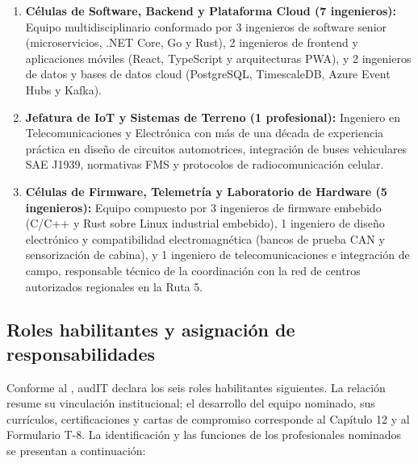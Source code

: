 \begin{enumerate}
  \item \textbf{Células de Software, Backend y Plataforma Cloud (7 ingenieros):} Equipo multidisciplinario conformado por 3 ingenieros de software senior (microservicios, .NET Core, Go y Rust), 2 ingenieros de frontend y aplicaciones móviles (React, TypeScript y arquitecturas PWA), y 2 ingenieros de datos y bases de datos cloud (PostgreSQL, TimescaleDB, Azure Event Hubs y Kafka).
  \item \textbf{Jefatura de IoT y Sistemas de Terreno (1 profesional):} Ingeniero en Telecomunicaciones y Electrónica con más de una década de experiencia práctica en diseño de circuitos automotrices, integración de buses vehiculares SAE J1939, normativas FMS y protocolos de radiocomunicación celular.
  \item \textbf{Células de Firmware, Telemetría y Laboratorio de Hardware (5 ingenieros):} Equipo compuesto por 3 ingenieros de firmware embebido (C/C++ y Rust sobre Linux industrial embebido), 1 ingeniero de diseño electrónico y compatibilidad electromagnética (bancos de prueba CAN y sensorización de cabina), y 1 ingeniero de telecomunicaciones e integración de campo, responsable técnico de la coordinación con la red de centros autorizados regionales en la Ruta 5.
\end{enumerate}

\subsection{Roles habilitantes y asignación de responsabilidades}\label{sec:1-roles-habilitantes}

Conforme al , audIT declara los seis roles habilitantes siguientes. La relación resume su vinculación institucional; el desarrollo del equipo nominado, sus currículos, certificaciones y cartas de compromiso corresponde al Capítulo 12 y al Formulario T-8. La identificación y las funciones de los profesionales nominados se presentan a continuación:

